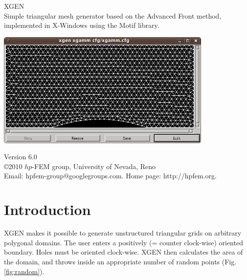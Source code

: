 \documentclass[12pt]{article}
\begin{document}
  \begin{titlepage}
  \begin{center}
\vbox{}

    \vspace{30mm}

    {\Huge  XGEN}\\[6mm]

Simple triangular mesh generator based on the Advanced Front method,\\
implemented in X-Windows using the Motif library.

    \vspace{20mm}

\begin{center}
\includegraphics[width=0.8\textwidth]{xgen-2.png}
\end{center}
    \vspace{20mm}

    Version 6.0\\
    \copyright 2010 $hp$-FEM group, University of Nevada, Reno\\
    Email: hpfem-group@googlegroups.com. Home page: http://hpfem.org.

  \end{center}
  \end{titlepage}

  \section{Introduction}

  XGEN makes it possible to generate unstructured
  triangular grids on arbitrary polygonal domains. The user enters 
  a positively (= counter clock-wise) oriented boundary. Holes must 
  be oriented clock-wise. XGEN then calculates the area of the domain, and 
  throws inside an appropriate number of random points (Fig. \ref{fig:random}).
\end{document}
